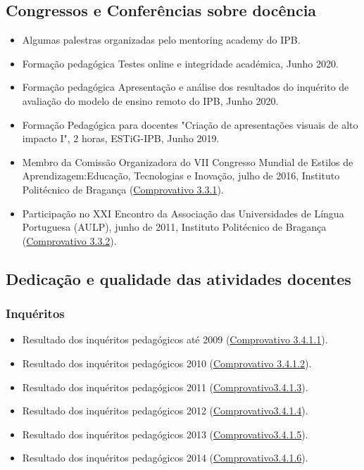 \documentclass[11pt]{article}
\begin{document}
\subsection{Congressos e Conferências sobre docência}
\begin{itemize}
\item {Algumas palestras organizadas pelo mentoring academy do IPB.}
\item {Formação pedagógica Testes online e integridade académica, Junho 2020.}
\item {Formação pedagógica Apresentação e análise dos resultados do inquérito de avaliação do modelo de ensino remoto do IPB, Junho 2020.}
\item {Formação Pedagógica para docentes "Criação de apresentações visuais de alto impacto I", 2 horas, ESTiG-IPB, Junho 2019.}
\item {Membro da Comissão Organizadora do VII Congresso Mundial de Estilos de Aprendizagem:Educação, Tecnologias e Inovação, julho de 2016, Instituto Politécnico de Bragança (\href{run:CongressoDocencia/cmea2016.pdf}{Comprovativo 3.3.1}).}
\item {Participação no XXI Encontro da Associação das Universidades de Língua Portuguesa (AULP), junho de 2011, Instituto Politécnico de Bragança (\href{run:CongressoDocencia/AULP.pdf}{Comprovativo 3.3.2}).}
\end{itemize}

\subsection{Dedicação e qualidade das atividades docentes}
\subsubsection{Inquéritos}
\begin{itemize}
\item {Resultado dos inquéritos pedagógicos até 2009 (\href{run:Inqueritos/inqueritosATE2009.pdf}{Comprovativo 3.4.1.1}).}
\item {Resultado dos inquéritos pedagógicos 2010 (\href{run:Inqueritos/relatorioPedagogico2010.pdf}{Comprovativo 3.4.1.2}).}
\item {Resultado dos inquéritos pedagógicos 2011 (\href{run:Inqueritos/relatorioPedagogico2011.pdf}{Comprovativo3.4.1.3}).}
\item {Resultado dos inquéritos pedagógicos 2012 (\href{run:Inqueritos/relatorioPedagogico2012.pdf}{Comprovativo3.4.1.4}).}
\item {Resultado dos inquéritos pedagógicos 2013 (\href{run:Inqueritos/relatorioPedagogico2013.pdf}{Comprovativo3.4.1.5}).}
\item {Resultado dos inquéritos pedagógicos 2014 (\href{run:Inqueritos/relatorioPedagogico2014.pdf}{Comprovativo3.4.1.6}).}
\end{itemize}
\end{document}
